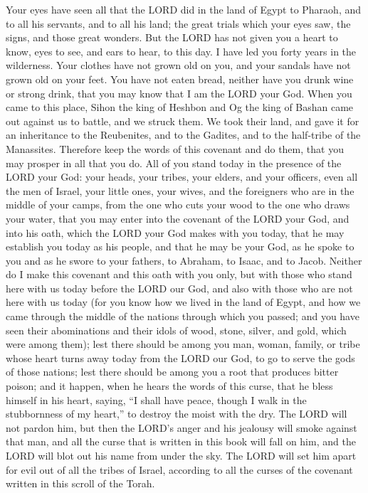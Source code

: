 Your eyes have seen all that the LORD did in the land of Egypt to Pharaoh, and to all his
servants, and to all his land;
\myverse{}the great trials which your eyes saw, the signs, and those great wonders.
\myverse{}But the LORD has not given you a heart to know, eyes to see, and ears to hear,
to this day.
\myverse{}I have led you forty years in the wilderness. Your clothes have not grown old
on you, and your sandals have not grown old on your feet.
\myverse{}You have not eaten bread, neither have you drunk wine or strong drink, that
you may know that I am the LORD your God.
\myverse{}When you came to this place, Sihon the king of Heshbon and Og the king of Bashan
came out against us to battle, and we struck them.
\myverse{}We took their land, and gave it for an inheritance to the Reubenites, and to
the Gadites, and to the half-tribe of the Manassites.
\myverse{}Therefore keep the words of this covenant and do them, that you may prosper
in all that you do.
\myverse{}All of you stand today in the presence of the LORD your God: your heads,
your tribes, your elders, and your officers, even all the men of Israel,
\myverse{}your little ones, your wives, and the foreigners who are in the middle of
your camps, from the one who cuts your wood to the one who draws your water,
\myverse{}that you may enter into the covenant of the LORD your God, and into his oath,
which the LORD your God makes with you today,
\myverse{}that he may establish you today as his people, and that he may be your God,
as he spoke to you and as he swore to your fathers, to Abraham, to Isaac, and to Jacob.
\myverse{}Neither do I make this covenant and this oath with you only,
\myverse{}but with those who stand here with us today before the LORD our God, and
also with those who are not here with us today
\myverse{}(for you know how we lived in the land of Egypt, and how we came through
the middle of the nations through which you passed;
\myverse{}and you have seen their abominations and their idols of wood, stone, silver,
and gold, which were among them);
\myverse{}lest there should be among you man, woman, family, or tribe whose heart turns
away today from the LORD our God, to go to serve the gods of those nations; lest there should be among
you a root that produces bitter poison;
\myverse{}and it happen, when he hears the words of this curse, that he bless himself
in his heart, saying, “I shall have peace, though I walk in the stubbornness of my heart,” to destroy
the moist with the dry.
\myverse{}The LORD will not pardon him, but then the LORD’s anger and his jealousy
will smoke against that man, and all the curse that is written in this book will fall on him, and the
LORD will blot out his name from under the sky.
\myverse{}The LORD will set him apart for evil out of all the tribes of Israel, according
to all the curses of the covenant written in this scroll of the Torah.

